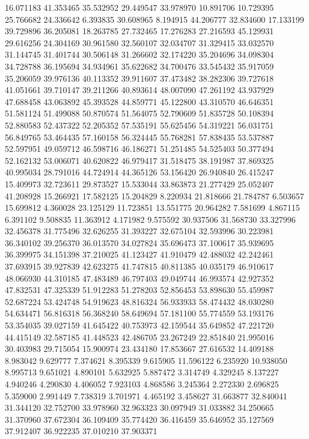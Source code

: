 16.071183
41.353465
35.532952
29.449547
33.978970
10.891706
10.729395
25.766682
24.336642
6.393835
30.608965
8.194915
44.206777
32.834600
17.133199
39.729896
36.205081
18.263785
27.732465
17.276283
27.216593
45.129931
29.616256
24.304169
30.961580
32.560107
32.034707
31.329415
33.032570
31.144745
31.401744
30.506148
31.266602
32.174220
35.204696
34.098304
34.728788
36.195694
34.934961
35.622682
34.700476
33.545432
35.917059
35.206059
39.976136
40.113352
39.911607
37.473482
38.282306
39.727618
41.051661
39.710147
39.211266
40.893614
48.007090
47.261192
43.937929
47.688458
43.063892
45.393528
44.859771
45.122800
43.310570
46.646351
51.581124
51.499088
50.870574
51.564075
52.790609
51.835728
50.108394
52.880583
52.437322
52.205352
57.535191
55.625456
54.319221
56.031751
56.849765
53.464435
57.160158
56.324445
55.768281
57.838435
53.537887
52.597951
49.059712
46.598716
46.186271
51.251485
54.525403
50.377494
52.162132
53.006071
40.620822
46.979417
31.518475
38.191987
37.869325
40.995034
28.791016
44.724914
44.365126
53.156420
26.940840
26.415247
15.409973
32.723611
29.873527
15.533044
33.863873
21.277429
25.052407
41.208928
15.266921
17.582125
15.204829
8.220934
21.818666
21.784787
6.503657
15.699812
4.360028
23.125129
11.723851
13.551775
20.964282
7.581699
4.867115
6.391102
9.508835
11.363912
4.171982
9.575592
30.937506
31.568730
33.327996
32.456378
31.775496
32.626255
31.393227
32.675104
32.593996
30.223981
36.340102
39.256370
36.013570
34.027824
35.696473
37.100617
35.939695
36.399975
34.151398
37.210025
41.123427
41.910479
42.488032
42.242461
37.693915
39.927839
42.623275
41.747815
40.811385
40.035179
46.910617
48.066930
44.310185
47.483489
46.797403
49.049744
46.993574
42.927352
47.832531
47.325339
51.912283
51.278203
52.856453
53.898630
55.459987
52.687224
53.424748
54.919623
48.816324
56.933933
58.474432
48.030280
54.634471
56.816318
56.368240
58.649694
57.181100
55.774559
53.193176
53.354035
39.027159
41.645422
40.753973
42.159544
35.649852
47.221720
44.415149
32.587185
41.448523
42.486705
23.267249
22.851840
21.995016
30.403983
29.715054
15.900974
23.434180
17.853667
27.616532
14.409188
8.983042
9.629777
7.374621
8.395339
9.615905
11.596122
6.235920
10.938050
8.995713
9.651021
4.890101
5.632925
5.887472
3.314749
4.329245
8.137227
4.940246
4.290830
4.406052
7.923103
4.868586
3.245364
2.272330
2.696825
5.359000
2.991449
7.738319
3.701971
4.465192
3.458627
31.663877
32.840041
31.344120
32.752700
33.978960
32.963323
30.097949
31.033882
34.250665
31.370960
37.672304
36.109409
35.774420
36.416459
35.646952
35.127569
37.912407
36.922235
37.010210
37.903371
